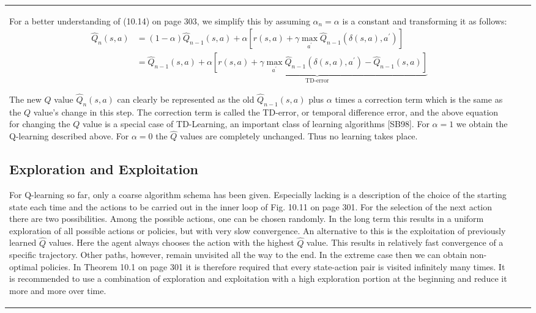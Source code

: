 \documentclass[10pt]{book}
\begin{document}
\begin{center}
\begin{tabular}{|l|l|l|}
For a better understanding of (10.14) on page 303, we simplify this by assuming $\alpha_{n}=\alpha$ is a constant and transforming it as follows:
$$
\begin{aligned}
\hat{Q}_{n}(s, a) & =(1-\alpha) \hat{Q}_{n-1}(s, a)+\alpha\left[r(s, a)+\gamma \max _{a^{\prime}} \hat{Q}_{n-1}\left(\delta(s, a), a^{\prime}\right)\right] \\
& =\hat{Q}_{n-1}(s, a)+\underbrace{\alpha\left[r(s, a)+\gamma \max _{a^{\prime}} \hat{Q}_{n-1}\left(\delta(s, a), a^{\prime}\right)-\hat{Q}_{n-1}(s, a)\right]}_{\text{TD-error}}
\end{aligned}
$$

The new $Q$ value $\hat{Q}_{n}(s, a)$ can clearly be represented as the old $\hat{Q}_{n-1}(s, a)$ plus $\alpha$ times a correction term which is the same as the $Q$ value's change in this step. The correction term is called the TD-error, or temporal difference error, and the above equation for changing the $Q$ value is a special case of TD-Learning, an important class of learning algorithms [SB98]. For $\alpha=1$ we obtain the Q-learning described above. For $\alpha=0$ the $\hat{Q}$ values are completely unchanged. Thus no learning takes place.

\subsection{Exploration and Exploitation}
For Q-learning so far, only a coarse algorithm schema has been given. Especially lacking is a description of the choice of the starting state each time and the actions to be carried out in the inner loop of Fig. 10.11 on page 301. For the selection of the next action there are two possibilities. Among the possible actions, one can be chosen randomly. In the long term this results in a uniform exploration of all possible actions or policies, but with very slow convergence. An alternative to this is the exploitation of previously learned $\hat{Q}$ values. Here the agent always chooses the action with the highest $\hat{Q}$ value. This results in relatively fast convergence of a specific trajectory. Other paths, however, remain unvisited all the way to the end. In the extreme case then we can obtain non-optimal policies. In Theorem 10.1 on page 301 it is therefore required that every state-action pair is visited infinitely many times. It is recommended to use a combination of exploration and exploitation with a high exploration portion at the beginning and reduce it more and more over time.


\end{tabular}
\end{center}
\end{document}
